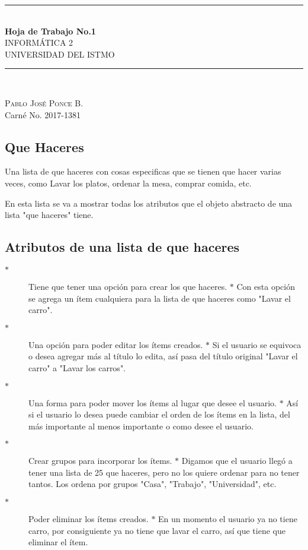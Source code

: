 \documentclass[12pt]{extreport}
\newcommand{\horrule}[1]{\rule{\linewidth}{#1}}
\begin{document}
\begin{titlepage}
\begin{center}
\horrule{1pt}\\
[0.5cm]
\huge{\textbf{Hoja de Trabajo No.1}}\\
\textsc{\large INFORMÁTICA 2}\\
\textsc{\large UNIVERSIDAD DEL ISTMO}\\
[0.02cm]
\horrule{1pt}\\
[12.5cm]
\end{center}
\begin{flushright}
\textsc{\large Pablo José Ponce B.}\\
Carné No. 2017-1381
\end{flushright}
\end{titlepage}


\begin{center}
\section*{Que Haceres}\label{sec:quehaceres}
\end{center}
Una lista de que haceres con cosas especificas que se tienen que hacer varias veces, como Lavar los platos, ordenar la mesa, comprar comida, etc.

En esta lista se va a mostrar todas los atributos que el objeto abstracto de una lista "que haceres" tiene.\\

\subsection*{Atributos de una lista de que haceres}
\begin{description} 
\item[$\ast$ ]Tiene que tener una opción para crear los que haceres.
\subitem$\ast$ Con esta opción se agrega un ítem cualquiera para la lista de que haceres como "Lavar el carro". 
\item[$\ast$ ]Una opción para poder editar los ítems creados.
\subitem$\ast$ Si el usuario se equivoca o desea agregar más al título lo edita, así pasa del título original "Lavar el carro" a "Lavar los carros".
\item[$\ast$ ]Una forma para poder mover los ítems al lugar que desee el usuario.
\subitem$\ast$ Así si el usuario lo desea puede cambiar el orden de los ítems en la lista, del más importante al menos importante o como desee el usuario.
\item[$\ast$ ]Crear grupos para incorporar los ítems.
\subitem$\ast$ Digamos que el usuario llegó a tener una lista de 25 que haceres, pero no los quiere ordenar para no tener tantos. Los ordena por grupos "Casa", "Trabajo", "Universidad", etc.
\item[$\ast$ ]Poder eliminar los ítems creados.
\subitem$\ast$ En un momento el usuario ya no tiene carro, por consiguiente ya no tiene que lavar el carro, así que tiene que eliminar el ítem.
\end{description}
\newpage
\end{document}
